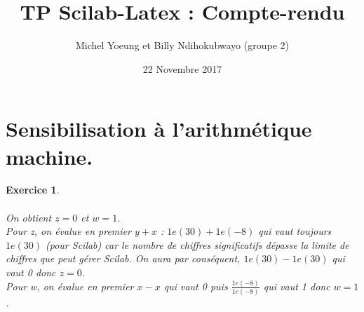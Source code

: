 \documentclass[a4paper,11pt]{article}
\title{TP Scilab-Latex : Compte-rendu}
\author{Michel Yoeung et Billy Ndihokubwayo (groupe 2)}
\date{22 Novembre 2017}
\newtheorem{exo}{Exercice}
\begin{document}
\maketitle

\section{Sensibilisation à l'arithmétique machine.}

\begin{exo} \ \\ \\
On obtient $ z=0 $ et $ w=1 $. \\
Pour z, on évalue en premier $ y+x $ : $ 1e(30)+1e(-8) $ qui vaut toujours $ 1e(30) $ (pour Scilab) car le nombre de chiffres significatifs dépasse la limite de chiffres que peut gérer Scilab. On aura par conséquent, $ 1e(30)-1e(30) $ qui vaut 0 donc $ z=0 $. \\
Pour w, on évalue en premier $ x-x $ qui vaut 0 puis $ \frac{1e(-8)}{1e(-8)} $ qui vaut 1 donc $ w=1 $.
\end{exo}
\end{document}

